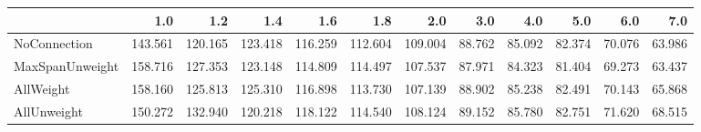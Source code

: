 \begin{tabular}{lrrrrrrrrrrr}
\toprule
{} &     1.0 &     1.2 &     1.4 &     1.6 &     1.8 &     2.0 &    3.0 &    4.0 &    5.0 &    6.0 &    7.0 \\
\midrule
NoConnection    & 143.561 & 120.165 & 123.418 & 116.259 & 112.604 & 109.004 & 88.762 & 85.092 & 82.374 & 70.076 & 63.986 \\
MaxSpanUnweight & 158.716 & 127.353 & 123.148 & 114.809 & 114.497 & 107.537 & 87.971 & 84.323 & 81.404 & 69.273 & 63.437 \\
AllWeight       & 158.160 & 125.813 & 125.310 & 116.898 & 113.730 & 107.139 & 88.902 & 85.238 & 82.491 & 70.143 & 65.868 \\
AllUnweight     & 150.272 & 132.940 & 120.218 & 118.122 & 114.540 & 108.124 & 89.152 & 85.780 & 82.751 & 71.620 & 68.515 \\
\bottomrule
\end{tabular}
